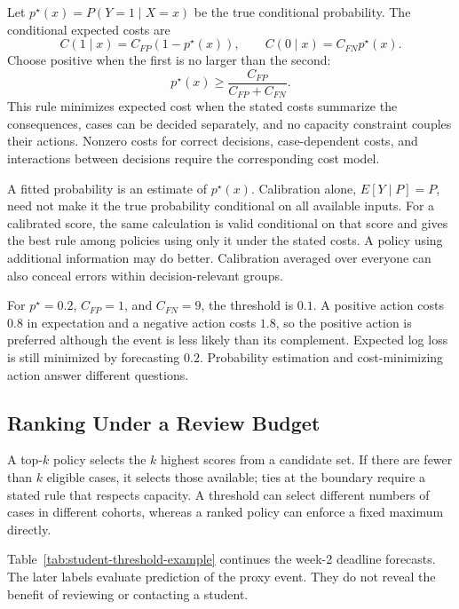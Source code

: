 Let $p^\star(x)=P(Y=1\mid X=x)$ be the true conditional probability. The conditional expected costs are
\[
C(1\mid x)=C_{FP}(1-p^\star(x)),\qquad
C(0\mid x)=C_{FN}p^\star(x).
\]
Choose positive when the first is no larger than the second:
\[
p^\star(x)\geq\frac{C_{FP}}{C_{FP}+C_{FN}}.
\]
This rule minimizes expected cost when the stated costs summarize the consequences, cases can be decided separately, and no capacity constraint couples their actions. Nonzero costs for correct decisions, case-dependent costs, and interactions between decisions require the corresponding cost model.

A fitted probability is an estimate of $p^\star(x)$. Calibration alone, $E[Y\mid P]=P$, need not make it the true probability conditional on all available inputs. For a calibrated score, the same calculation is valid conditional on that score and gives the best rule among policies using only it under the stated costs. A policy using additional information may do better. Calibration averaged over everyone can also conceal errors within decision-relevant groups.

For $p^\star=0.2$, $C_{FP}=1$, and $C_{FN}=9$, the threshold is $0.1$. A positive action costs $0.8$ in expectation and a negative action costs $1.8$, so the positive action is preferred although the event is less likely than its complement. Expected log loss is still minimized by forecasting $0.2$. Probability estimation and cost-minimizing action answer different questions.

\subsection{Ranking Under a Review Budget}

A top-$k$ policy selects the $k$ highest scores from a candidate set. If there are fewer than $k$ eligible cases, it selects those available; ties at the boundary require a stated rule that respects capacity. A threshold can select different numbers of cases in different cohorts, whereas a ranked policy can enforce a fixed maximum directly.

Table~\ref{tab:student-threshold-example} continues the week-2 deadline forecasts. The later labels evaluate prediction of the proxy event. They do not reveal the benefit of reviewing or contacting a student.

